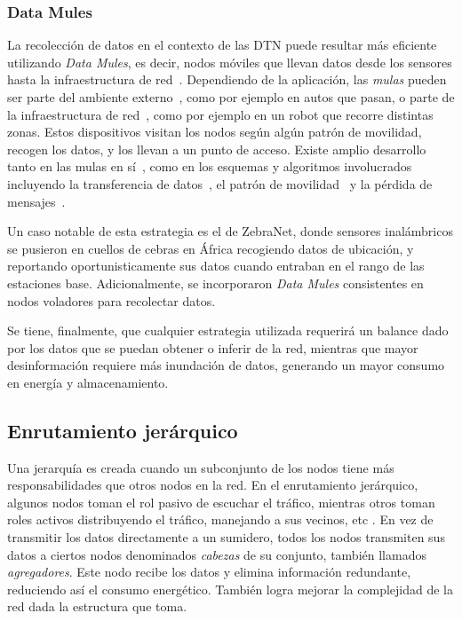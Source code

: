 \documentclass[10pt,preprint,onecolumn]{paper}
\begin{document}
\subsubsection{Data Mules}
\label{sec:mules}

La recolección de datos en el contexto de las DTN puede resultar más eficiente utilizando \emph{Data Mules}, es decir, nodos móviles que llevan datos desde los sensores hasta la infraestructura de red~\cite{datamule1}. Dependiendo de la aplicación, las \emph{mulas} pueden ser parte del ambiente externo~\cite{mulemob}, como por ejemplo en autos que pasan, o parte de la infraestructura de red~\cite{int1}, como por ejemplo en un robot que recorre distintas zonas. Estos dispositivos visitan los nodos según algún patrón de movilidad, recogen los datos, y los llevan a un punto de acceso.
Existe amplio desarrollo tanto en las mulas en sí~\cite{mule1}, como en los esquemas y algoritmos involucrados incluyendo la transferencia de datos~\cite{mulestopwait, mulewindow}, el patrón de movilidad~\cite{mulemob} y la pérdida de mensajes~\cite{muleloss}.

Un caso notable de esta estrategia es el de ZebraNet\cite{11}, donde sensores inalámbricos se pusieron en cuellos de cebras en África recogiendo datos de ubicación, y reportando oportunisticamente sus datos cuando entraban en el rango de las estaciones base. Adicionalmente, se incorporaron \emph{Data Mules} consistentes en nodos voladores para recolectar datos. 

Se tiene, finalmente, que cualquier estrategia utilizada requerirá un balance dado por los datos que se puedan obtener o inferir de la red, mientras que mayor desinformación requiere más inundación de datos, generando un mayor consumo en energía y almacenamiento.


\subsection{Enrutamiento jerárquico}
\label{sec:hier}

Una jerarquía es creada cuando un subconjunto de los nodos tiene más responsabilidades que otros nodos en la red. En el enrutamiento jerárquico, algunos nodos toman el rol pasivo de escuchar el tráfico, mientras otros toman roles activos distribuyendo el tráfico, manejando a sus vecinos, etc \cite{51}. En vez de transmitir los datos directamente a un sumidero, todos los nodos transmiten sus datos a ciertos nodos denominados \emph{cabezas} de su conjunto, también llamados \emph{agregadores}\cite{105}. Este nodo recibe los datos y elimina información redundante, reduciendo así el consumo energético. También logra mejorar la complejidad de la red dada la estructura que toma. 
\end{document}

